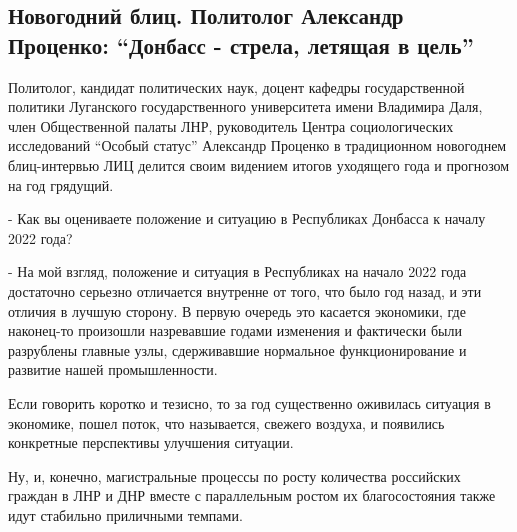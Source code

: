  
 
 
 
 
\subsection{Новогодний блиц. Политолог Александр Проценко: \enquote{Донбасс - стрела, летящая в цель}}
\label{sec:27_12_2021.stz.news.lnr.lug_info.2.donbass_strela}


Политолог, кандидат политических наук, доцент кафедры государственной политики
Луганского государственного университета имени Владимира Даля, член
Общественной палаты ЛНР, руководитель Центра социологических исследований
\enquote{Особый статус} Александр Проценко в традиционном новогоднем блиц-интервью ЛИЦ
делится своим видением итогов уходящего года и прогнозом на год грядущий.


- Как вы оцениваете положение и ситуацию в Республиках Донбасса к началу 2022
года?

- На мой взгляд, положение и ситуация в Республиках на начало 2022 года
достаточно серьезно отличается внутренне от того, что было год назад, и эти
отличия в лучшую сторону. В первую очередь это касается экономики, где
наконец-то произошли назревавшие годами изменения и фактически были разрублены
главные узлы, сдерживавшие нормальное функционирование и развитие нашей
промышленности.

Если говорить коротко и тезисно, то за год существенно оживилась ситуация в
экономике, пошел поток, что называется, свежего воздуха, и появились конкретные
перспективы улучшения ситуации.

Ну, и, конечно, магистральные процессы по росту количества российских граждан в
ЛНР и ДНР вместе с параллельным ростом их благосостояния также идут стабильно
приличными темпами.

